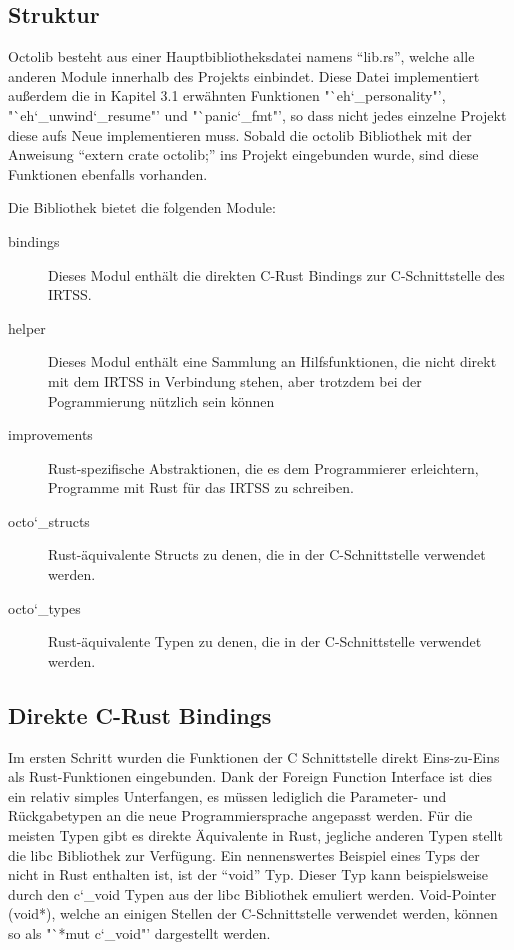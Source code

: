 \subsection{Struktur}

Octolib besteht aus einer Hauptbibliotheksdatei namens "`lib.rs"', welche alle anderen Module innerhalb des Projekts einbindet. Diese
Datei implementiert außerdem die in Kapitel 3.1 erwähnten Funktionen "`eh\char`_personality"', "`eh\char`_unwind\char`_resume"' und
"`panic\char`_fmt"', so dass nicht jedes einzelne Projekt diese aufs Neue implementieren muss. Sobald die octolib Bibliothek
mit der Anweisung "`extern crate octolib;"' ins Projekt eingebunden wurde, sind diese Funktionen ebenfalls vorhanden.

Die Bibliothek bietet die folgenden Module:

\begin{description}

	\item[bindings] 
	Dieses Modul enthält die direkten C-Rust Bindings zur C-Schnittstelle des IRTSS.
	
	\item[helper]
	Dieses Modul enthält eine Sammlung an Hilfsfunktionen, die nicht direkt mit dem IRTSS in Verbindung stehen,
	aber trotzdem bei der Pogrammierung nützlich sein können
	
	\item[improvements]
	Rust-spezifische Abstraktionen, die es dem Programmierer erleichtern, Programme mit Rust für das IRTSS zu schreiben.
	
	\item[octo\char`_structs]
	Rust-äquivalente Structs zu denen, die in der C-Schnittstelle verwendet werden.
	
	\item[octo\char`_types]
	Rust-äquivalente Typen zu denen, die in der C-Schnittstelle verwendet werden.

\end{description}

\subsection{Direkte C-Rust Bindings}

Im ersten Schritt wurden die Funktionen der C Schnittstelle direkt Eins-zu-Eins als Rust-Funktionen eingebunden. Dank der
Foreign Function Interface ist dies ein relativ simples Unterfangen, es müssen lediglich die Parameter- und Rückgabetypen
an die neue Programmiersprache angepasst werden. Für die meisten Typen gibt es direkte Äquivalente in Rust, jegliche anderen Typen
stellt die libc Bibliothek zur Verfügung. Ein nennenswertes Beispiel eines Typs der nicht in Rust enthalten ist, ist der
"`void"' Typ. Dieser Typ kann beispielsweise durch den c\char`_void Typen aus der libc Bibliothek emuliert werden.
Void-Pointer (void*), welche an einigen Stellen der C-Schnittstelle verwendet werden, können so als "`*mut c\char`_void"'
dargestellt werden.

